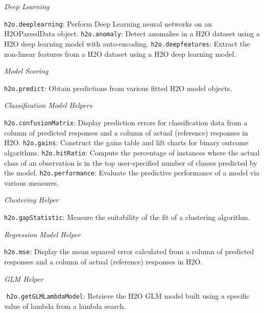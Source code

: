 \documentclass[11pt]{article}
\begin{document}
{{\emph{Deep Learning}\par
{\texttt{h2o.deeplearning}}: Perform Deep Learning neural networks on an H2OParsedData object.\newline
{\texttt{h2o.anomaly}}: Detect anomalies in a H2O dataset using a H2O deep learning model with auto-encoding.\newline
{\texttt{h2o.deepfeatures}}: Extract the non-linear features from a H2O dataset using a H2O deep learning model.\newline

\emph{Model Scoring}\par
{\texttt{h2o.predict}}: Obtain predictions from various fitted H2O model objects.\newline

\emph{Classification Model Helpers}\par
{\texttt{h2o.confusionMatrix}}: Display prediction errors for classification data from a column of predicted responses and a column of actual (reference) responses in H2O.\newline
{\texttt{h2o.gains}}: Construct the gains table and lift charts for binary outcome algorithms.\newline
{\texttt{h2o.hitRatio}}: Compute the percentage of instances where the actual class of an observation is in the top user-specified number of classes predicted by the model.\newline
{\texttt{h2o.performance}}: Evaluate the predictive performance of a model via various measures.\newline

{\emph{Clustering Helper}}\par
{\texttt{h2o.gapStatistic}}: Measure the suitability of the fit of a clustering algorithm. \newline

\emph{Regression Model Helper}\par
{\texttt{h2o.mse}}: Display the mean squared error calculated from a column of predicted responses and a column of actual (reference) responses in H2O.\newline

\emph{GLM Helper}\par
 {\texttt{h2o.getGLMLambdaModel}}: Retrieve the H2O GLM model built using a specific value of lambda from a lambda search.\newline

}}
\end{document}

